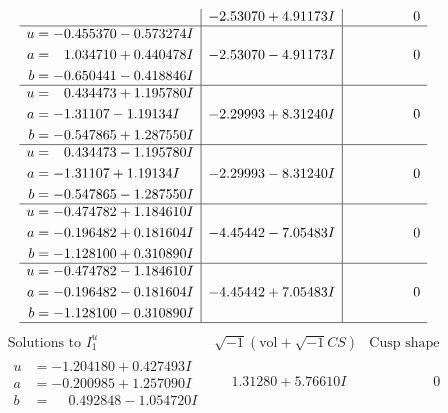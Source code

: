 \documentclass[1p]{elsarticle_modified}
\theoremstyle{definition}
\newcommand{\I}{\sqrt{-1}}
\begin{document}
$$\begin{array}{c|c|c}
 & -2.53070 + 4.91173 I & \phantom{-0.000000 } 0 \\ \hline\begin{aligned}
u &= -0.455370 - 0.573274 I \\
a &= \phantom{-}1.034710 + 0.440478 I \\
b &= -0.650441 - 0.418846 I\end{aligned}
 & -2.53070 - 4.91173 I & \phantom{-0.000000 } 0 \\ \hline\begin{aligned}
u &= \phantom{-}0.434473 + 1.195780 I \\
a &= -1.31107 - 1.19134 I \\
b &= -0.547865 + 1.287550 I\end{aligned}
 & -2.29993 + 8.31240 I & \phantom{-0.000000 } 0 \\ \hline\begin{aligned}
u &= \phantom{-}0.434473 - 1.195780 I \\
a &= -1.31107 + 1.19134 I \\
b &= -0.547865 - 1.287550 I\end{aligned}
 & -2.29993 - 8.31240 I & \phantom{-0.000000 } 0 \\ \hline\begin{aligned}
u &= -0.474782 + 1.184610 I \\
a &= -0.196482 + 0.181604 I \\
b &= -1.128100 + 0.310890 I\end{aligned}
 & -4.45442 - 7.05483 I & \phantom{-0.000000 } 0 \\ \hline\begin{aligned}
u &= -0.474782 - 1.184610 I \\
a &= -0.196482 - 0.181604 I \\
b &= -1.128100 - 0.310890 I\end{aligned}
 & -4.45442 + 7.05483 I & \phantom{-0.000000 } 0\\
 \hline 
 \end{array}$$\newpage$$\begin{array}{c|c|c}  
\text{Solutions to }I^u_{1}& \I (\text{vol} + \sqrt{-1}CS) & \text{Cusp shape}\\
 \hline 
\begin{aligned}
u &= -1.204180 + 0.427493 I \\
a &= -0.200985 + 1.257090 I \\
b &= \phantom{-}0.492848 - 1.054720 I\end{aligned}
 & \phantom{-}1.31280 + 5.76610 I & \phantom{-0.000000 } 0 \\ \hline\begin{aligned}

\end{aligned}
\end{array}$$
\end{document}
